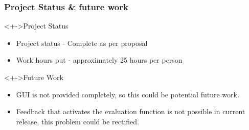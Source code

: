 \documentclass[10pt,red]{beamer}
\begin{document}
\begin{frame}
 \frametitle{Project Status \& future work}

\begin{block}<+->{Project Status}

\begin{itemize}
 \item Project status - Complete as per proposal
 \item Work hours put - approximately 25 hours per person 
\end{itemize}

\end{block}

\begin{block}<+->{Future Work}

\begin{itemize}
 \item GUI is not provided completely, so this could be potential future work.
 \item Feedback that activates the evaluation function is not possible in current release, this problem could be rectified.
\end{itemize}

\end{block}






\end{frame}



\begin{frame}



\end{frame}


% 
% 
% 
% 
% 
% 
% 
\end{document}
